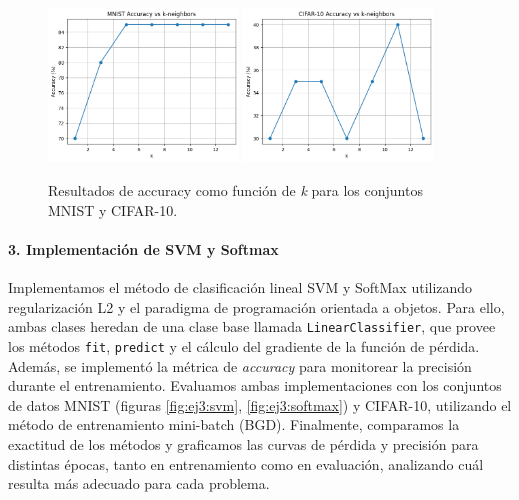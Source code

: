 \documentclass[a4paper,12pt]{article}
\begin{document}
\begin{figure}[!h]
    \centering
    \includegraphics[width=0.45\textwidth]{ej2_mnist_knn_acc.png}
    \quad
    \includegraphics[width=0.45\textwidth]{ej2_cifar_knn_acc.png}
    \caption{Resultados de accuracy como función de \textit{k} para los conjuntos MNIST y CIFAR-10. \label{fig:ej2:knn}}
\end{figure}

\paragraph{3. Implementación de SVM y Softmax}
Implementamos el método de clasificación lineal SVM y SoftMax utilizando regularización L2 y el paradigma de programación orientada a objetos. Para ello, ambas clases heredan de una clase base llamada \texttt{LinearClassifier}, que provee los métodos \texttt{fit}, \texttt{predict} y el cálculo del gradiente de la función de pérdida. Además, se implementó la métrica de \textit{accuracy} para monitorear la precisión durante el entrenamiento. Evaluamos ambas implementaciones con los conjuntos de datos MNIST (figuras \ref{fig:ej3:svm}, \ref{fig:ej3:softmax}) y CIFAR-10, utilizando el método de entrenamiento mini-batch (BGD). Finalmente, comparamos la exactitud de los métodos y graficamos las curvas de pérdida y precisión para distintas épocas, tanto en entrenamiento como en evaluación, analizando cuál resulta más adecuado para cada problema.
\end{document}
